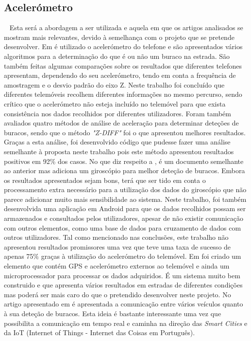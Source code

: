 \subsection{Acelerómetro}\
\label{subsec: acelerometro}
Esta será a abordagem a ser utilizada e aquela em que os artigos analisados se mostram mais relevantes, devido à semelhança com o projeto que se pretende desenvolver. Em \cite{Mednis2011} é utilizado o acelerómetro do telefone e são apresentados vários algoritmos para a determinação do que é ou não um buraco na estrada. São também feitas algumas comparações sobre os resultados que diferentes telefones apresentam, dependendo do seu acelerómetro, tendo em conta a frequência de amostragem e o desvio padrão do eixo Z.
Neste trabalho foi concluído que diferentes telemóveis recolhem diferentes informações no mesmo percurso, sendo crítico que o acelerómetro não esteja incluído no telemóvel para que exista consistência nos dados recolhidos por diferentes utilizadores.
Foram também avaliados quatro métodos de análise de aceleração para determinar deteções de buracos, sendo que o método \emph{"Z-DIFF"} foi o que apresentou melhores resultados.
Graças a esta análise, foi desenvolvido código que pudesse fazer uma análise semelhante à proposta neste trabalho pois este método apresentou resultados positivos em 92\% dos casos.
No que diz respeito a \cite{Fouad}, é um documento semelhante ao anterior mas adiciona um giroscópio para melhor deteção de buracos. Embora os resultados apresentados sejam bons, terá que ser tido em conta o processamento extra necessário para a utilização dos dados do giroscópio que não parece adicionar muito mais sensibilidade ao sistema.
Neste trabalho, foi também desenvolvida uma aplicação em Android para que os dados recolhidos possam ser armazenados e consultados pelos utilizadores, apesar de não existir comunicação com outros elementos, como uma base de dados para cruzamento de dados com outros utilizadores.
Tal como mencionado nas conclusões, este trabalho não apresentou resultados promissores uma vez que teve uma taxa de sucesso de apenas 75\% graças à utilização do acelerómetro do telemóvel.
Em \cite{Chen2011} foi criado um elemento que contém GPS e acelerómetro externos ao telemóvel e ainda um microprocessador para processar os dados adquiridos. É um sistema muito bem construido e que apresenta vários resultados em estradas de diferentes condições mas poderá ser mais caro do que o pretendido desenvolver neste projeto. No artigo apresentado em \cite{Jang} é apresentada a comunicação entre vários veículos quanto à sua deteção de buracos. Esta ideia é bastante interessante uma vez que possibilita a comunicação em tempo real e caminha na direção das \emph{Smart Cities} e da IoT (Internet of Things - Internet das Coisas em Português).
